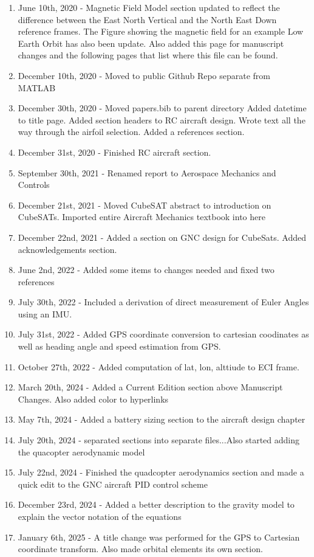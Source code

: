 \documentclass{article}
\begin{document}
\begin{enumerate}[itemsep=-5pt]
\item June 10th, 2020 - Magnetic Field Model section updated to
  reflect the difference between the East North Vertical and the North
  East Down reference frames. The Figure showing the magnetic field
  for an example Low Earth Orbit has also been update. Also added this
  page for manuscript changes and the following pages that list where
  this file can be found.
\item December 10th, 2020 - Moved to public Github Repo separate from
  MATLAB
\item December 30th, 2020 - Moved papers.bib to parent directory Added
  datetime to title page. Added  section headers to RC aircraft
  design. Wrote text all the way through the airfoil selection. Added
  a references section.
\item December 31st, 2020 - Finished RC aircraft section.
\item September 30th, 2021 - Renamed report to Aerospace Mechanics and
  Controls
\item December 21st, 2021 - Moved CubeSAT abstract to introduction on
  CubeSATs. Imported entire Aircraft Mechanics textbook into here
\item December 22nd, 2021 - Added a section on GNC design for
  CubeSats. Added acknowledgements section.
\item June 2nd, 2022 - Added some items to changes needed and fixed
  two references
\item July 30th, 2022 - Included a derivation of direct measurement of Euler Angles using an IMU.
\item July 31st, 2022 - Added GPS coordinate conversion to cartesian coodinates as well as heading angle and speed estimation from GPS.
\item October 27th, 2022 - Added computation of lat, lon, alttiude to ECI frame.
\item March 20th, 2024 - Added a Current Edition section above
  Manuscript Changes. Also added color to hyperlinks
\item May 7th, 2024 - Added a battery sizing section to the aircraft
  design chapter
\item July 20th, 2024 - separated sections into separate files...Also started adding the quacopter aerodynamic model
\item July 22nd, 2024 - Finished the quadcopter aerodynamics section and made a quick edit to the GNC aircraft PID control scheme
\item December 23rd, 2024 - Added a better description to the gravity model to explain the vector notation of the equations
\item January 6th, 2025 - A title change was performed for the GPS to Cartesian coordinate transform. Also made orbital elements its own section.
\end{enumerate}
\end{document}
